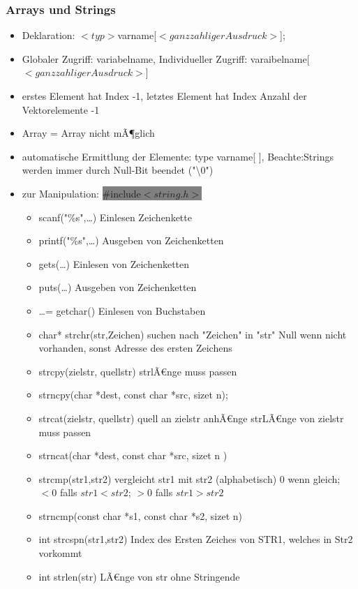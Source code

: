 \documentclass[10pt,a5paper]{article}
\newcommand{\cbg}[1]{\colorbox{grey}{#1}}
\begin{document}
\subsubsection{Arrays und Strings}
\begin{itemize}
\item Deklaration:
\subitem\ensuremath{<typ>}varname[\ensuremath{<ganzzahliger Ausdruck>}];
\item Globaler Zugriff:
\subitem variabelname, Individueller Zugriff: varaibelname[\ensuremath{<ganzzahliger Ausdruck>}]
\item erstes Element hat Index -1, letztes Element hat Index \subitem Anzahl der Vektorelemente -1
\item Array = Array nicht mÃ¶glich
\item automatische Ermittlung der Elemente: type varname[ ], Beachte:Strings werden immer durch Null-Bit beendet ("\textbackslash 0")
\item zur Manipulation: \cbg{\#include\ensuremath{<string.h>}}\begin{itemize}
\item scanf("\%s",\dots) Einlesen Zeichenkette
\item printf("\%s",\dots) Ausgeben von Zeichenketten
\item gets(\dots) Einlesen von Zeichenketten
\item puts(\dots) Ausgeben von Zeichenketten
\item \dots = getchar() Einlesen von Buchstaben
\item char* strchr(str,Zeichen)  suchen nach "Zeichen" in "str" \subitem Null wenn nicht vorhanden, sonst Adresse des ersten Zeichens
\item strcpy(zielstr, quellstr)  strlÃ€nge muss passen
\item strncpy(char *dest, const char *src, size\textunderscore t n);
\item strcat(zielstr, quellstr)  quell an zielstr anhÃ€nge strLÃ€nge von zielstr muss passen
\item strncat(char *dest, const char *src, size\textunderscore t n )
\item strcmp(str1,str2) vergleicht str1 mit str2 (alphabetisch) 0 wenn gleich; \ensuremath{<0} falls \ensuremath{str1<str2}; \ensuremath{>0} falls \ensuremath{str1>str2}
\item strncmp(const char *s1, const char *s2, size\textunderscore t n) 
\item int strcspn(str1,str2) Index des Ersten Zeiches von STR1, welches in Str2 vorkommt
\item int strlen(str) LÃ€nge von str ohne Stringende

\end{itemize}
\end{itemize}
\end{document}
